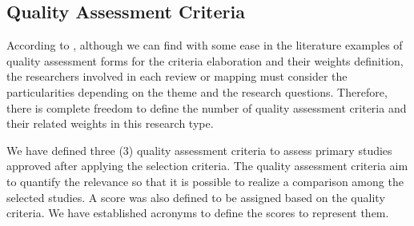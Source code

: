  
\subsection{Quality Assessment Criteria} \label{ssec_slm:qualityCriteria}

According to \cite{Nakagawa:2017}, although we can find with some ease in the literature examples of quality assessment forms for the criteria elaboration and their weights definition, the researchers involved in each review or mapping must consider the particularities depending on the theme and the research questions.
Therefore, there is complete freedom to define the number of quality assessment criteria and their related weights in this research type.

We have defined three (3) quality assessment criteria to assess primary studies approved after applying the selection criteria.
The quality assessment criteria aim to quantify the relevance so that it is possible to realize a comparison among the selected studies.
A score was also defined to be assigned based on the quality criteria.
We have established acronyms to define the scores to represent them.

